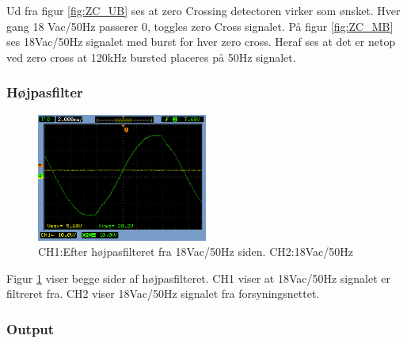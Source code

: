 Ud fra figur \ref{fig:ZC_UB} ses at zero Crossing detectoren virker som ønsket. Hver gang 18 Vac/50Hz passerer 0, toggles zero Cross signalet.
På figur \ref{fig:ZC_MB} ses 18Vac/50Hz signalet med burst for hver zero cross. Heraf ses at det er netop ved zero cross at 120kHz bursted placeres på 50Hz signalet. 



\subsubsection{Højpasfilter}

\begin{figure}[H]
	\centering
	\includegraphics[width=0.50\textwidth]{billeder/HWTest/Encoder/Encoder_hojpasfilter}
	\caption{CH1:Efter højpasfilteret fra 18Vac/50Hz siden. CH2:18Vac/50Hz}
	\label{fig:HP_SCOP}
\end{figure}

Figur \ref{fig:HP_SCOP} viser begge sider af højpasfilteret. CH1 viser at 18Vac/50Hz signalet er filtreret fra. CH2 viser 18Vac/50Hz signalet fra forsyningsnettet.


\subsubsection{Output}

